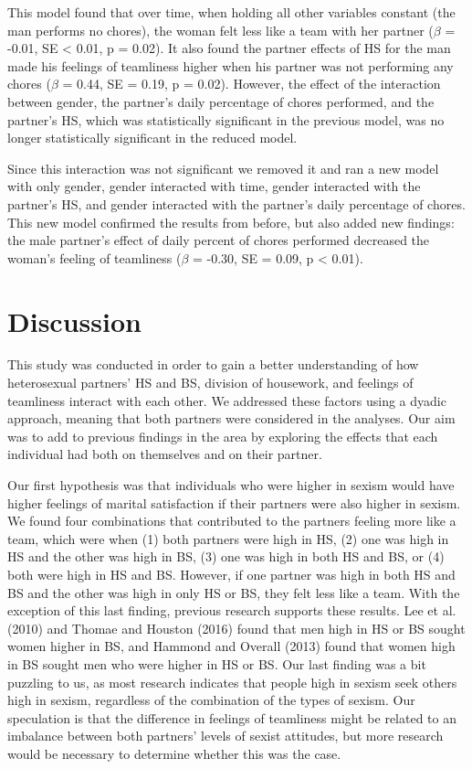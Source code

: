 \documentclass[
  man]{apa6}
\begin{document}
This model found that over time, when holding all other variables constant (the man performs no chores), the woman felt less like a team with her partner (\(\beta\) = -0.01, SE \textless{} 0.01, p = 0.02). It also found the partner effects of HS for the man made his feelings of teamliness higher when his partner was not performing any chores (\(\beta\) = 0.44, SE = 0.19, p = 0.02). However, the effect of the interaction between gender, the partner's daily percentage of chores performed, and the partner's HS, which was statistically significant in the previous model, was no longer statistically significant in the reduced model.

Since this interaction was not significant we removed it and ran a new model with only gender, gender interacted with time, gender interacted with the partner's HS, and gender interacted with the partner's daily percentage of chores. This new model confirmed the results from before, but also added new findings: the male partner's effect of daily percent of chores performed decreased the woman's feeling of teamliness (\(\beta\) = -0.30, SE = 0.09, p \textless{} 0.01).

\hypertarget{discussion}{%
\section{Discussion}\label{discussion}}

This study was conducted in order to gain a better understanding of how heterosexual partners' HS and BS, division of housework, and feelings of teamliness interact with each other. We addressed these factors using a dyadic approach, meaning that both partners were considered in the analyses. Our aim was to add to previous findings in the area by exploring the effects that each individual had both on themselves and on their partner.

Our first hypothesis was that individuals who were higher in sexism would have higher feelings of marital satisfaction if their partners were also higher in sexism. We found four combinations that contributed to the partners feeling more like a team, which were when (1) both partners were high in HS, (2) one was high in HS and the other was high in BS, (3) one was high in both HS and BS, or (4) both were high in HS and BS. However, if one partner was high in both HS and BS and the other was high in only HS or BS, they felt less like a team. With the exception of this last finding, previous research supports these results. Lee et al. (2010) and Thomae and Houston (2016) found that men high in HS or BS sought women higher in BS, and Hammond and Overall (2013) found that women high in BS sought men who were higher in HS or BS. Our last finding was a bit puzzling to us, as most research indicates that people high in sexism seek others high in sexism, regardless of the combination of the types of sexism. Our speculation is that the difference in feelings of teamliness might be related to an imbalance between both partners' levels of sexist attitudes, but more research would be necessary to determine whether this was the case.
\end{document}
